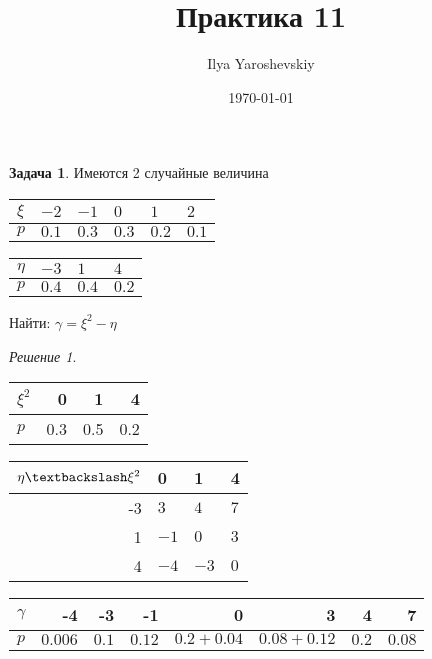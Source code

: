 \documentclass[english]{article}
\author{Ilya Yaroshevskiy}
\date{\today}
\title{Практика 11}
\theoremstyle{plain}
\theoremstyle{remark}
\newtheorem*{solution}{Решение}
\theoremstyle{definition}
\newtheorem{task}{Задача}
\begin{document}
\maketitle
\tableofcontents

\begin{task}
Имеются 2 случайные величина
\begin{center}
\begin{tabular}{l|lllll}
\(\xi\) & \(-2\) & \(-1\) & \(0\) & \(1\) & \(2\)\\
\hline
\(p\) & \(0.1\) & \(0.3\) & \(0.3\) & \(0.2\) & \(0.1\)\\
\end{tabular}
\end{center}


\begin{center}
\begin{tabular}{l|lll}
\(\eta\) & \(-3\) & \(1\) & \(4\)\\
\hline
\(p\) & \(0.4\) & \(0.4\) & \(0.2\)\\
\end{tabular}
\end{center}
Найти: \(\gamma = \xi^2 - \eta\)
\end{task}
\begin{solution}
\begin{center}
\begin{tabular}{l|rrr}
\(\xi^2\) & 0 & 1 & 4\\
\hline
\(p\) & 0.3 & 0.5 & 0.2\\
\end{tabular}
\end{center}


\begin{center}
\begin{tabular}{r|lll}
\(\eta\textbackslash\xi^2\) & 0 & 1 & 4\\
\hline
-3 & \(3\) & \(4\) & \(7\)\\
1 & \(-1\) & \(0\) & \(3\)\\
4 & \(-4\) & \(-3\) & \(0\)\\
\end{tabular}
\end{center}


\begin{center}
\begin{tabular}{l|rrrrrrr}
\(\gamma\) & -4 & -3 & -1 & 0 & 3 & 4 & 7\\
\hline
\(p\) & \(0.006\) & \(0.1\) & \(0.12\) & \(0.2 + 0.04\) & \(0.08 + 0.12\) & \(0.2\) & \(0.08\)\\
\end{tabular}
\end{center}
\end{solution}
\end{document}
